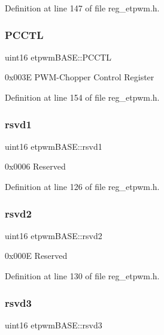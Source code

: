 Definition at line 147 of file reg\+\_\+etpwm.\+h.

\mbox{\label{structetpwmBASE_a1cc55af6dadc8f02978f81122d0b9c47}} 
\subsubsection{\texorpdfstring{P\+C\+C\+TL}{PCCTL}}
{\footnotesize\ttfamily uint16 etpwm\+B\+A\+S\+E\+::\+P\+C\+C\+TL}

0x003E P\+W\+M-\/\+Chopper Control Register 

Definition at line 154 of file reg\+\_\+etpwm.\+h.

\mbox{\label{structetpwmBASE_ab43be32a68026e0314c5a1b427456a4f}} 
\subsubsection{\texorpdfstring{rsvd1}{rsvd1}}
{\footnotesize\ttfamily uint16 etpwm\+B\+A\+S\+E\+::rsvd1}

0x0006 Reserved 

Definition at line 126 of file reg\+\_\+etpwm.\+h.

\mbox{\label{structetpwmBASE_ab16078e7a154740052c3554779dc6eaa}} 
\subsubsection{\texorpdfstring{rsvd2}{rsvd2}}
{\footnotesize\ttfamily uint16 etpwm\+B\+A\+S\+E\+::rsvd2}

0x000E Reserved 

Definition at line 130 of file reg\+\_\+etpwm.\+h.

\mbox{\label{structetpwmBASE_a0c55402db4d574c329b0cfd8f39c6096}} 
\subsubsection{\texorpdfstring{rsvd3}{rsvd3}}
{\footnotesize\ttfamily uint16 etpwm\+B\+A\+S\+E\+::rsvd3}

